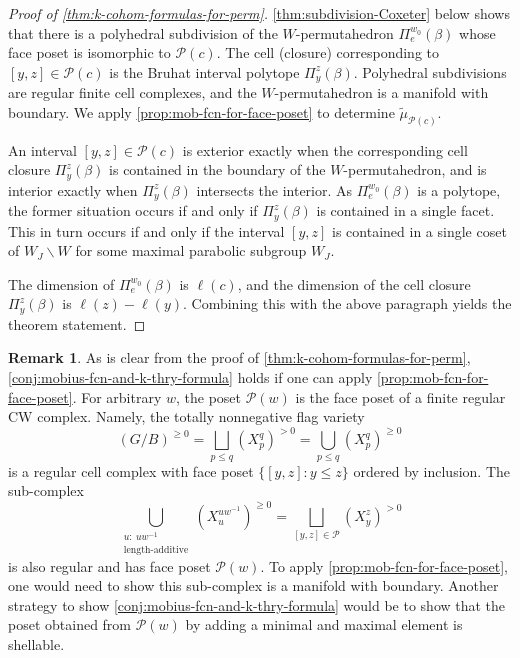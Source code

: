 \documentclass[11pt]{amsart}
\theoremstyle{definition}
\newtheorem{remark}[Thm]{Remark}
\def\pt{\beta}
\def\calP{\mathcal{P}}
\def\mob{\tilde{\mu}}
\begin{document}
 \begin{proof}[Proof of \cref{thm:k-cohom-formulas-for-perm}]
 	\cref{thm:subdivision-Coxeter} below shows that there is a polyhedral subdivision of the $W$-permutahedron $\Pi_e^{w_0}(\pt)$ whose face poset is isomorphic to $\calP(c)$. The cell (closure) corresponding to $[y,z] \in \calP(c)$ is the Bruhat interval polytope $\Pi_y^z(\pt)$. Polyhedral subdivisions are regular finite cell complexes, and the $W$-permutahedron is a manifold with boundary. We apply \cref{prop:mob-fcn-for-face-poset} to determine $\mob_{\calP(c)}$. 
 	
 	An interval $[y,z] \in \calP(c)$ is exterior exactly when the corresponding cell closure $\Pi_y^z(\pt)$ is contained in the boundary of the $W$-permutahedron, and is interior exactly when $\Pi_y^z(\pt)$ intersects the interior. As $\Pi_e^{w_0}(\pt)$ is a polytope, the former situation occurs if and only if $\Pi_y^{z}(\pt)$ is contained in a single facet. This in turn occurs if and only if the interval $[y,z]$ is contained in a single coset of $W_J\backslash W$ for some maximal parabolic subgroup $W_J$. 
 	
 	The dimension of $\Pi_e^{w_0}(\pt)$ is $\ell(c)$, and the dimension of the cell closure $\Pi_y^z(\pt)$ is $\ell(z) - \ell(y)$. Combining this with the above paragraph yields the theorem statement.
 \end{proof}
 
 
 \begin{remark} As is clear from the proof of \cref{thm:k-cohom-formulas-for-perm}, \cref{conj:mobius-fcn-and-k-thry-formula} holds if one can apply \cref{prop:mob-fcn-for-face-poset}.
For arbitrary $w$, the poset $\calP(w)$ is the face poset of a finite regular CW complex. Namely, the totally nonnegative flag variety 
 	\[(G/B)^{\ge 0} = \bigsqcup_{p\leq q}(X_p^q)^{>0} =\bigcup_{p\leq q}(X_p^q)^{\ge 0} \]
 	is a regular cell complex \cite{GKL22} with face poset $\{[y, z]: y \leq z\}$ ordered by inclusion. The sub-complex
 	\[\bigcup_{\substack{u: ~uw^{-1}\\\text{length-additive}}} (X_u^{uw^{-1}})^{ \ge 0}= \bigsqcup_{[y,z] \in \calP} (X_y^z)^{>0}\]
 	is also regular and has face poset $\calP(w)$. To apply \cref{prop:mob-fcn-for-face-poset}, one would need to show this sub-complex is a manifold with boundary. Another strategy to show \cref{conj:mobius-fcn-and-k-thry-formula} would be to show that the poset obtained from $\calP(w)$ by adding a minimal and maximal element is shellable.
 \end{remark}
 
\end{document}

